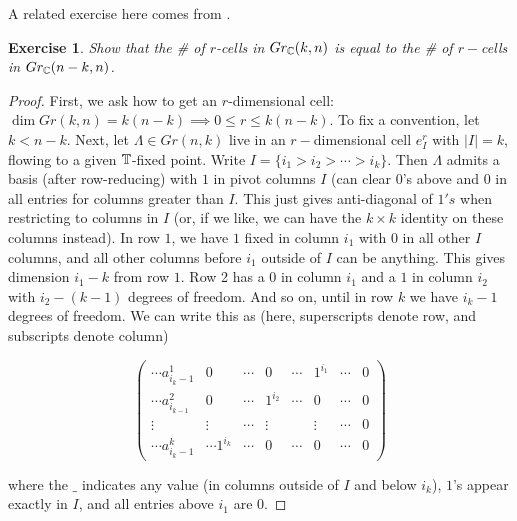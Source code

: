 \documentclass{amsart}
\newtheorem{exc}[theorem]{Exercise}
\begin{document}
A related exercise here comes from \cite{milnor1974characteristic}. 



\begin{exc} Show that the \# of $r$-cells in $Gr_{\mathbb{C}}(k,n)$ is equal to the \# of $r-$cells in $Gr_{\mathbb{C}}(n-k,n)$. \end{exc}

\begin{proof} First, we ask how to get an $r$-dimensional cell: $\dim Gr(k,n) = k(n-k) \implies 0\leq r \leq k(n-k)$. To fix a convention, let $k <  n-k$. Next, let $\Lambda \in Gr(n,k)$ live in an $r-$dimensional cell $e_I^r$ with $|I|=k$, flowing to a given $\mathbb{T}$-fixed point. Write $I = \{i_1>i_2> \cdots >i_k\}$. Then $\Lambda$ admits a basis (after row-reducing) with $1$ in pivot columns $I$ (can clear 0's above and $0$ in all entries for columns greater than $I$. This just gives anti-diagonal of $1's$ when restricting to columns in $I$ (or, if we like, we can have the $k \times k$ identity on these columns instead). In row $1$, we have $1$ fixed in column $i_1$ with $0$ in all other $I$ columns, and all other columns before $i_1$ outside of $I$ can be anything. This gives dimension $i_1 - k$ from row $1$. Row 2 has a $0$ in column $i_1$ and a $1$ in column $i_2$ with $i_2 - (k-1)$ degrees of freedom. And so on, until in row $k$ we have $i_k - 1$ degrees of freedom. We can write this as (here, superscripts denote row, and subscripts denote column)

\[ \left( \begin{array}{ccccccc|c} \cdots a^1_{i_{k}-1} & 0 & \cdots & 0 & \cdots & 1^{i_1} & \cdots & 0  \\ \cdots a^2_{i_{k-1}}  & 0 & \cdots & 1^{i_2} & \cdots  & 0 & \cdots& 0 \\
\vdots &  \vdots & \cdots  & \vdots &  & \vdots &   \cdots & 0  \\
\cdots a^k_{i_{k}-1} & \cdots  1^{i_k} & \cdots & 0 & \cdots &  0 & \cdots& 0 \end{array} \right) \] 

where the $\_ $ indicates any value (in columns outside of $I$ and below $i_k$), $1$'s appear exactly in $I$, and all entries above $i_1$ are $0$. 

\end{proof}
\end{document}
